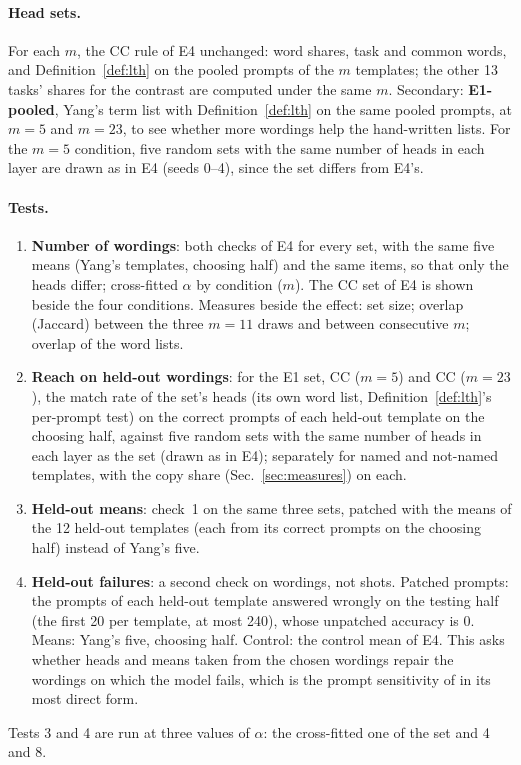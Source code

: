 \documentclass[11pt,a4paper]{article}
\begin{document}
\paragraph{Head sets.} For each $m$, the CC rule of E4 unchanged: word shares, task and
common words, and Definition~\ref{def:lth} on the pooled prompts of the $m$ templates; the other 13
tasks' shares for the contrast are computed under the same $m$. Secondary: \textbf{E1-pooled},
Yang's term list with Definition~\ref{def:lth} on the same pooled prompts, at $m = 5$ and $m = 23$, to see
whether more wordings help the hand-written lists. For the $m = 5$ condition, five random sets
with the same number of heads in each layer are drawn as in E4 (seeds 0--4), since the set
differs from E4's.

\paragraph{Tests.}
\begin{enumerate}
  \item \textbf{Number of wordings}: both checks of E4 for every set, with the same five means
    (Yang's templates, choosing half) and the same items, so that only the heads differ;
    cross-fitted $\alpha$ by condition ($m$). The CC set of E4 is shown beside the four
    conditions. Measures beside the effect: set size; overlap
    (Jaccard) between the three $m = 11$ draws and between consecutive $m$; overlap of the
    word lists.
  \item \textbf{Reach on held-out wordings}: for the E1 set, CC ($m = 5$) and CC ($m = 23$),
    the match rate of the set's heads (its own word list, Definition~\ref{def:lth}'s per-prompt test) on the
    correct prompts of each held-out template on the choosing half, against five random sets
    with the same number of heads in each layer as the set (drawn as in E4); separately for
    named and not-named templates, with the copy share (Sec.~\ref{sec:measures}) on each.
  \item \textbf{Held-out means}: check~1 on the same three sets, patched with the means of the
    12 held-out templates (each from its correct prompts on the choosing half) instead of
    Yang's five.
  \item \textbf{Held-out failures}: a second check on wordings, not shots. Patched prompts:
    the prompts of each held-out template answered wrongly on the testing half (the first 20
    per template, at most 240), whose unpatched accuracy is 0. Means: Yang's five, choosing
    half. Control: the control mean of E4. This asks whether heads and means taken from the
    chosen wordings repair the wordings on which the model fails, which is the prompt
    sensitivity of \citet{yang2026shared} in its most direct form.
\end{enumerate}
Tests 3 and 4 are run at three values of $\alpha$: the cross-fitted one of the set and 4 and 8.
\end{document}
